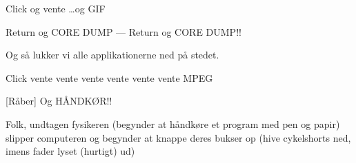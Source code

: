 \documentclass[10pt]{article}
\begin{document}
\begin{sketch}
 Click og vente \ldots og GIF

 Return og CORE DUMP --- Return og CORE DUMP!!

 Og så lukker vi alle applikationerne ned på stedet.

 Click vente vente vente vente vente vente MPEG

[Råber] Og HÅNDKØR!!

\scene Folk, undtagen fysikeren (begynder at håndkøre et program med pen og
papir) slipper computeren og begynder at knappe deres bukser op (hive
cykelshorts ned, imens fader lyset (hurtigt) ud)


\end{sketch}
\end{document}
